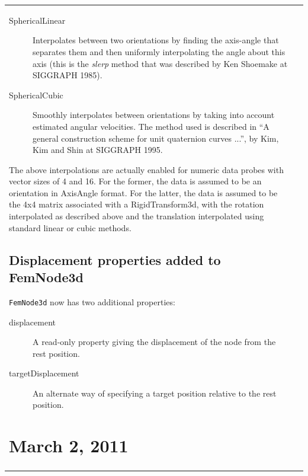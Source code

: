 \documentclass{article}
\begin{document}
\begin{tabular}{ll}
\begin{description}

\item[SphericalLinear]  \mbox{}

Interpolates between two orientations by finding the axis-angle
that separates them and then uniformly interpolating the
angle about this axis (this is the {\it slerp} method that
was described by Ken Shoemake at SIGGRAPH 1985).

\item[SphericalCubic]  \mbox{}

Smoothly interpolates between orientations by taking into account
estimated angular velocities. The method used is described in ``A
general construction scheme for unit quaternion curves ...'', by Kim,
Kim and Shin at SIGGRAPH 1995.

\end{description}

\begin{sideblock}
The above interpolations are actually enabled for numeric data
probes with vector sizes of 4 and 16. For the former, the data
is assumed to be an orientation in AxisAngle format. For the
latter, the data is assumed to be the 4x4 matrix associated with
a RigidTransform3d, with the rotation interpolated as
described above and the translation interpolated using standard
linear or cubic methods.
\end{sideblock}

\subsection*{Displacement properties added to FemNode3d}

{\tt FemNode3d} now has two additional properties:

\begin{description}

\item[displacement] \mbox{}

A read-only property giving the displacement of the node from the
rest position.

\item[targetDisplacement] \mbox{}

An alternate way of specifying a target position relative to
the rest position.

\end{description}

\section*{March 2, 2011}


\end{tabular}
\end{document}
